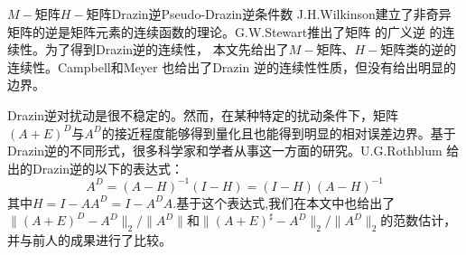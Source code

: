 
\begin{Cabstract}{$M-$矩阵}{$H-$矩阵}{Drazin逆}{Pseudo-Drazin逆}{条件数}
J.\nbs H.\nbs Wilkinson建立了非奇异矩阵的逆是矩阵元素的连续函数的理论。G.\nbs W.\nbs Stewart推出了矩阵 的广义逆 的连续性。为了得到Drazin逆的连续性， 本文先给出了$M-$矩阵、$H-$矩阵类的逆的连续性。Campbell和Meyer 也给出了Drazin 逆的连续性性质，但没有给出明显的边界。\par
Drazin逆对扰动是很不稳定的。然而，在某种特定的扰动条件下，矩阵$(A+E)^D$与$A^D$的接近程度能够得到量化且也能得到明显的相对误差边界。基于Drazin逆的不同形式，很多科学家和学者从事这一方面的研究。U.\nbs G.\nbs Rothblum 给出的Drazin逆的以下的表达式：
$$A^D=(A-H)^{-1}(I-H)=(I-H)(A-H)^{-1}$$
其中$H=I-AA^D=I-A^DA$.基于这个表达式,我们在本文中也给出了$\|(A+E)^D-A^D\|_2/\| A^D\|$和$\|(A+E)^\sharp-A^D\|_2/\|A^D\|_2$的范数估计，并与前人的成果进行了比较。
\end{Cabstract}
